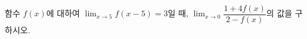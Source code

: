 함수 $f(x)$에 대하여 $\displaystyle\lim_{x\to 5}f(x-5)=3$일 때, $\displaystyle\lim_{x\to 0}\dfrac{1+4f(x)}{2-f(x)}$의 값을 구하시오.
